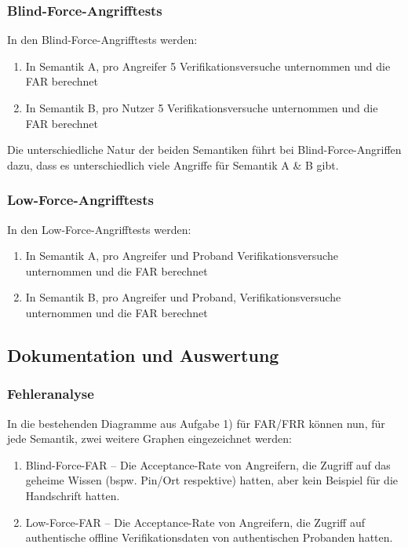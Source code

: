 \documentclass{article}
\begin{document}
\subsubsection{Blind-Force-Angrifftests}

In den Blind-Force-Angrifftests werden:

\begin{enumerate}
	\item In Semantik A, pro Angreifer 5 Verifikationsversuche unternommen und die FAR berechnet
	\item In Semantik B, pro Nutzer  5 Verifikationsversuche unternommen und die FAR berechnet
\end{enumerate}

Die unterschiedliche Natur der beiden Semantiken führt bei Blind-Force-Angriffen dazu, dass es 
unterschiedlich viele Angriffe für Semantik A \& B gibt.

\subsubsection{Low-Force-Angrifftests}

In den Low-Force-Angrifftests werden:

\begin{enumerate}
	\item In Semantik A, pro Angreifer und Proband Verifikationsversuche unternommen und die FAR berechnet
	\item In Semantik B, pro Angreifer und Proband, Verifikationsversuche unternommen und die FAR berechnet
\end{enumerate}

\subsection{Dokumentation und Auswertung}

\subsubsection{Fehleranalyse}

In die bestehenden Diagramme aus Aufgabe 1) für FAR/FRR können nun, für jede Semantik, zwei weitere Graphen eingezeichnet werden:

\begin{enumerate}
	\item Blind-Force-FAR – Die Acceptance-Rate von Angreifern, die Zugriff auf das geheime Wissen (bspw. Pin/Ort respektive) hatten, aber kein Beispiel für die Handschrift hatten.
	\item Low-Force-FAR – Die Acceptance-Rate von Angreifern, die Zugriff auf authentische offline Verifikationsdaten von authentischen Probanden hatten.
\end{enumerate}
\end{document}
